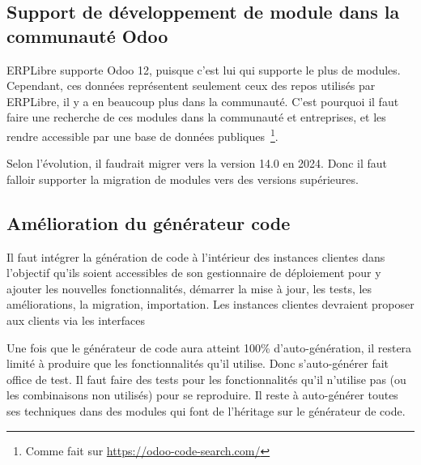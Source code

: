 \subsection{Support de développement de module dans la communauté Odoo}

ERPLibre supporte Odoo 12, puisque c’est lui qui supporte le plus de modules. Cependant, ces données représentent seulement ceux des repos utilisés par ERPLibre, il y a en beaucoup plus dans la communauté. C’est pourquoi il faut faire une recherche de ces modules dans la communauté et entreprises, et les rendre accessible par une base de données publiques~\footnote{Comme fait sur \url{https://odoo-code-search.com/}}.

Selon l’évolution, il faudrait migrer vers la version 14.0 en 2024. Donc il faut falloir supporter la migration de modules vers des versions supérieures.

\subsection{Amélioration du générateur code}

Il faut intégrer la génération de code à l’intérieur des instances clientes dans l’objectif qu’ils soient accessibles de son gestionnaire de déploiement pour y ajouter les nouvelles fonctionnalités, démarrer la mise à jour, les tests, les améliorations, la migration, importation. Les instances clientes devraient proposer aux clients via les interfaces 




Une fois que le générateur de code aura atteint 100\% d’auto-génération, il restera limité à produire que les fonctionnalités qu’il utilise. Donc s’auto-générer fait office de test. Il faut faire des tests pour les fonctionnalités qu’il n’utilise pas (ou les combinaisons non utilisés) pour se reproduire. Il reste à auto-générer toutes ses techniques dans des modules qui font de l'héritage sur le générateur de code.


